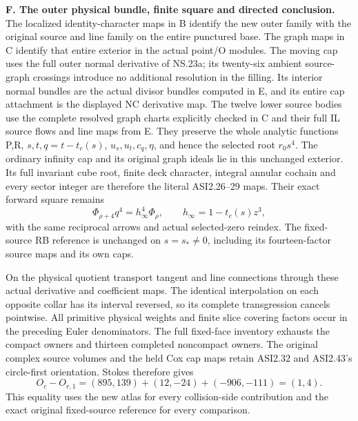 \medskip\noindent\textbf{F. The outer physical bundle, finite square and directed conclusion.}
The localized identity-character maps in B identify the new outer family
with the original source and line family on the entire punctured base.
The graph maps in C identify that entire exterior in the actual point/O
modules.  The moving cap uses the full outer normal derivative of NS.23a;
its twenty-six ambient source-graph crossings introduce no additional
resolution in the filling.  Its interior normal bundles are the actual
divisor bundles computed in E, and its entire cap attachment is the
displayed NC derivative map.  The twelve lower source bodies use the
complete resolved graph charts explicitly checked in C and their full
IL source flows and line maps from E.
They preserve the whole analytic functions P,R, \(s,t,q=t-t_c(s)\),
\(u_s,u_t,c_q,\eta\), and hence the selected root \(r_0s^4\).
The ordinary infinity cap and its original graph ideals lie in this
unchanged exterior.  Its full invariant cube root, finite deck character,
integral annular cochain and every sector integer are therefore the
literal ASI2.26--29 maps.  Their exact forward square remains
\[
                   \Phi_{\rho+4}q^4=h_\infty^4\Phi_\rho,
                   \qquad h_\infty=1-t_c(s)z^3,
\]
with the same reciprocal arrows and actual selected-zero reindex.
The fixed-source RB reference is unchanged on \(s=s_*\ne0\), including
its fourteen-factor source maps and its own caps.

On the physical quotient transport tangent and line connections through
these actual derivative and coefficient maps.  The identical
interpolation on each opposite collar has its interval reversed, so
its complete transgression cancels pointwise.  All primitive physical
weights and finite slice covering factors occur in the preceding
Euler denominators.  The full fixed-face inventory exhausts the compact
owners and thirteen completed noncompact owners.  The original complex
source volumes and the held Cox cap maps retain ASI2.32 and ASI2.43's
circle-first orientation.  Stokes therefore gives
\[
 O_c-O_{r,1}=(895,139)+(12,-24)+(-906,-111)=(1,4).
\]
This equality uses the new atlas for every collision-side contribution
and the exact original fixed-source reference for every comparison.

